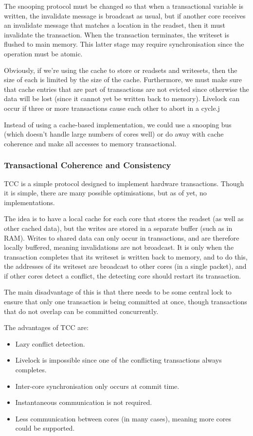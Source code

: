 The snooping protocol must be changed so that when a transactional
variable is written, the invalidate message is broadcast as usual, but
if another core receives an invalidate message that matches a location
in the readset, then it must invalidate the transaction. When the
transaction terminates, the writeset is flushed to main memory. This
latter stage may require synchronisation since the operation must be
atomic.

Obviously, if we're using the cache to store or readsets and
writesets, then the size of each is limited by the size of the
cache. Furthermore, we must make sure that cache entries that are part
of transactions are not evicted since otherwise the data will be lost
(since it cannot yet be written back to memory). Livelock can occur if
three or more transactions cause each other to abort in a cycle.j

Instead of using a cache-based implementation, we could use a snooping
bus (which doesn't handle large numbers of cores well) or do away with
cache coherence and make all accesses to memory transactional.

\subsubsection{Transactional Coherence and Consistency}

TCC is a simple protocol designed to implement hardware
transactions. Though it is simple, there are many possible
optimisations, but as of yet, no implementations.

The idea is to have a local cache for each core that stores the
readset (as well as other cached data), but the writes are stored in a
separate buffer (such as in RAM). Writes to shared data can only occur
in transactions, and are therefore locally buffered, meaning
invalidations are not broadcast. It is only when the transaction
completes that its writeset is written back to memory, and to do this,
the addresses of its writeset are broadcast to other cores (in a
single packet), and if other cores detect a conflict, the detecting
core should restart its transaction.

The main disadvantage of this is that there needs to be some central
lock to ensure that only one transaction is being committed at once,
though transactions that do not overlap can be committed concurrently.

The advantages of TCC are:

\begin{itemize}
\item Lazy conflict detection.
\item Livelock is impossible since one of the conflicting transactions always completes.
\item Inter-core synchronisation only occurs at commit time.
\item Instantaneous communication is not required.
\item Less communication between cores (in many cases), meaning more cores could be supported.
\end{itemize}


